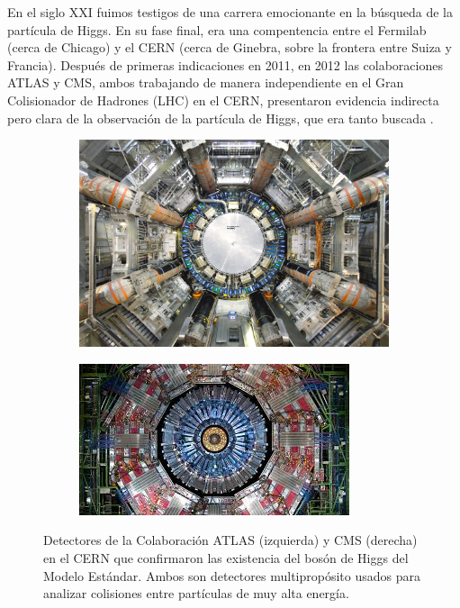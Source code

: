 En el siglo XXI fuimos testigos de una carrera emocionante en la
b\'usqueda de la part\'icula de Higgs. En su fase final, era una
compentencia entre el Fermilab (cerca de Chicago) y el CERN
(cerca de Ginebra, sobre la frontera entre Suiza y Francia).
Despu\'es de primeras indicaciones en 2011, en 2012 las
colaboraciones ATLAS y CMS, ambos trabajando de manera independiente
en el Gran Colisionador de Hadrones (LHC) en el CERN, presentaron
evidencia indirecta pero clara de la observaci\'on de la
part\'icula de Higgs, que era tanto buscada \cite{ATLASCMS}.

	
\begin{figure}

\begin{subfigure}{0.5\textwidth}
	\includegraphics[scale=0.27]{images/atlas.jpg}
\end{subfigure}	
\begin{subfigure}{0.5\textwidth}
	\includegraphics[scale=0.9]{images/cms.jpeg}
\end{subfigure}	
\caption{Detectores de la Colaboraci\'on ATLAS (izquierda) y CMS
(derecha) en el CERN que confirmaron las existencia del bos\'on
de Higgs del Modelo Est\'andar.
Ambos son detectores multiprop\'osito usados para
analizar colisiones entre part\'iculas de muy alta energ\'ia.}
\end{figure}


